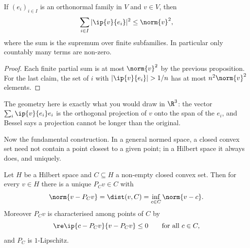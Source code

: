 \begin{corollary}
	If $(e_i)_{i \in I}$ is an orthonormal family in $V$ and $v \in V$, then
	$$\sum_{i \in I} |\ip{v}{e_i}|^2 \leq \norm{v}^2,$$
	where the sum is the supremum over finite subfamilies. In particular only countably many terms are non-zero.
\end{corollary}

\begin{proof}
	Each finite partial sum is at most $\norm{v}^2$ by the previous proposition. For the last claim, the set of $i$ with $|\ip{v}{e_i}| > 1/n$ has at most $n^2\norm{v}^2$ elements.
\end{proof}

The geometry here is exactly what you would draw in $\R^3$: the vector $\sum_i \ip{v}{e_i}e_i$ is the orthogonal projection of $v$ onto the span of the $e_i$, and Bessel says a projection cannot be longer than the original.

\begin{center}
\end{center}

Now the fundamental construction. In a general normed space, a closed convex set need not contain a point closest to a given point; in a Hilbert space it always does, and uniquely.

\begin{theorem}
	Let $H$ be a Hilbert space and $C \subseteq H$ a non-empty closed convex set. Then for every $v \in H$ there is a unique $P_Cv \in C$ with
	$$\norm{v - P_Cv} = \dist(v, C) = \inf_{c \in C}\norm{v - c}.$$
	Moreover $P_C v$ is characterised among points of $C$ by
	$$\re \ip{c - P_Cv}{v - P_Cv} \leq 0 \qquad \text{for all } c \in C,$$
	and $P_C$ is $1$-Lipschitz.
\end{theorem}

